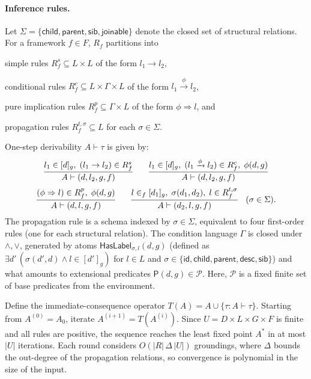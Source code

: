 \documentclass[runningheads,oneside]{llncs}
\begin{document}
\paragraph{Inference rules.}
Let $\Sigma=\{\textsf{child},\textsf{parent},\textsf{sib},\textsf{joinable}\}$ denote the closed set of structural relations. For a framework $f \in F$, $R_f$ partitions into \begin{enumerate*}[label=(\roman*)] \item simple rules $R_f^s\subseteq L\times L$ of the form $l_1\to l_2$, \item conditional rules $R_f^c\subseteq L\times\Gamma\times L$ of the form $l_1\xrightarrow{\phi} l_2$, \item pure implication rules $R_f^p\subseteq\Gamma\times L$ of the form $\phi\Rightarrow l$, and \item propagation rules $R_f^{t,\sigma}\subseteq L$ for each $\sigma\in\Sigma$.\end{enumerate*} One-step derivability $A\vdash\tau$ is given by:
\[
\footnotesize
\frac{l_1\in[d]_g,\ (l_1\to l_2)\in R_f^s}{A\vdash(d,l_2,g,f)}\qquad
\frac{l_1\in[d]_g,\ (l_1\xrightarrow{\phi} l_2)\in R_f^c,\ \phi(d,g)}{A\vdash(d,l_2,g,f)}
\]
\[
\footnotesize
\frac{(\phi\Rightarrow l)\in R_f^p,\ \phi(d,g)}{A\vdash(d,l,g,f)}\qquad
\frac{l\in_f[d_1]_g,\ \sigma(d_1,d_2),\ l\in R_f^{t,\sigma}}{A\vdash(d_2,l,g,f)} \quad (\sigma\in\Sigma).
\]
The propagation rule is a schema indexed by $\sigma\in\Sigma$, equivalent to four first-order rules (one for each structural relation).
The condition language $\Gamma$ is closed under $\land,\lor$, generated by atoms $\textsf{HasLabel}_{\sigma,l}(d,g)$ (defined as $\exists d'\,(\sigma(d',d)\wedge l\in[d']_g)$ for $l\in L$ and $\sigma\in\{\textsf{id},\textsf{child},\textsf{parent},\textsf{desc},\textsf{sib}\}$) and what amounts to extensional predicates $\textsf{P}(d,g)\in\mathcal{P}$. Here, $\mathcal{P}$ is a fixed finite set of base predicates from the environment.

\begin{proposition}\label{thm:convergence}
Define the immediate-consequence operator $T(A)=A\cup\{\tau: A\vdash\tau\}$. Starting from $A^{(0)}=A_0$, iterate $A^{(i+1)}=T(A^{(i)})$. Since $U=D\times L\times G\times F$ is finite and all rules are positive, the sequence reaches the least fixed point $A^*$ in at most $|U|$ iterations. Each round considers $O(|R|\,\Delta\,|U|)$ groundings, where $\Delta$ bounds the out-degree of the propagation relations, so convergence is polynomial in the size of the input.
\end{proposition}
\end{document}
